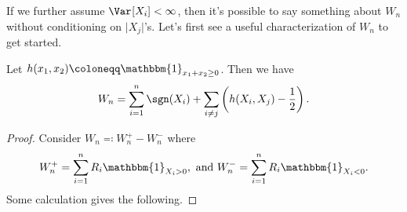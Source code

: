 If we further assume \(\Var_{}[X_i] < \infty \), then it's possible to say something about \(W_n\) without conditioning on \(\lvert X_j \rvert \)'s. Let's first see a useful characterization of \(W_n\) to get started.

\begin{proposition}\label{prop:Wilcoxon-signed-rank-test}
	Let \(h(x_1, x_2) \coloneqq \mathbbm{1}_{x_1 + x_2 \geq 0}\). Then we have
	\[
		W_n
		= \sum_{i=1}^{n} \sgn (X_i) + \sum_{i \neq j} \left( h(X_i , X_j) - \frac{1}{2} \right).
	\]
\end{proposition}
\begin{proof}
	Consider \(W_n \eqqcolon W_n^+ - W_n^-\) where
	\[
		W_n^+ = \sum_{i=1}^{n} R_i \mathbbm{1}_{X_i > 0} ,\text{ and }
		W_n^- = \sum_{i=1}^{n} R_i \mathbbm{1}_{X_i < 0}.
	\]
	Some calculation gives the following.


\end{proof}
